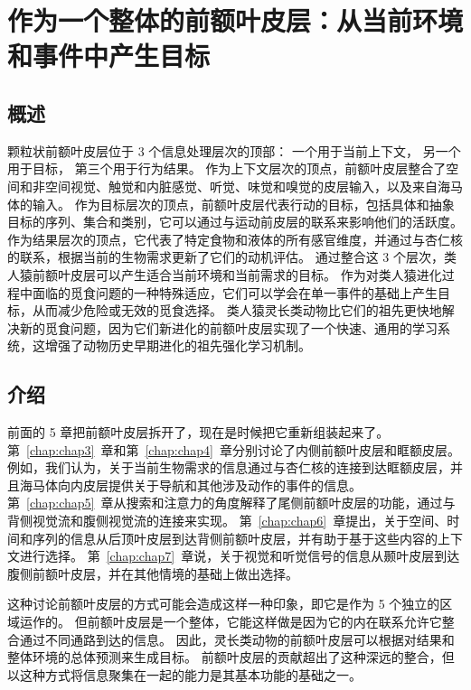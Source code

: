 \chapter{作为一个整体的前额叶皮层：从当前环境和事件中产生目标} \label{chap:chap8}

\section{概述}

颗粒状前额叶皮层位于 3 个信息处理层次的顶部：
一个用于当前上下文，
另一个用于目标，
第三个用于行为结果。
作为上下文层次的顶点，前额叶皮层整合了空间和非空间视觉、触觉和内脏感觉、听觉、味觉和嗅觉的皮层输入，以及来自海马体的输入。
作为目标层次的顶点，前额叶皮层代表行动的目标，包括具体和抽象目标的序列、集合和类别，它可以通过与运动前皮层的联系来影响他们的活跃度。
作为结果层次的顶点，它代表了特定食物和液体的所有感官维度，并通过与杏仁核的联系，根据当前的生物需求更新了它们的动机评估。
通过整合这 3 个层次，类人猿前额叶皮层可以产生适合当前环境和当前需求的目标。
作为对类人猿进化过程中面临的觅食问题的一种特殊适应，它们可以学会在单一事件的基础上产生目标，从而减少危险或无效的觅食选择。
类人猿灵长类动物比它们的祖先更快地解决新的觅食问题，因为它们新进化的前额叶皮层实现了一个快速、通用的学习系统，这增强了动物历史早期进化的祖先强化学习机制。



\section{介绍}
\par

前面的 5 章把前额叶皮层拆开了，现在是时候把它重新组装起来了。
第~\ref{chap:chap3}~章和第~\ref{chap:chap4}~章分别讨论了内侧前额叶皮层和眶额皮层。
例如，我们认为，关于当前生物需求的信息通过与杏仁核的连接到达眶额皮层，并且海马体向内皮层提供关于导航和其他涉及动作的事件的信息。
第~\ref{chap:chap5}~章从搜索和注意力的角度解释了尾侧前额叶皮层的功能，通过与背侧视觉流和腹侧视觉流的连接来实现。
第~\ref{chap:chap6}~章提出，关于空间、时间和序列的信息从后顶叶皮层到达背侧前额叶皮层，并有助于基于这些内容的上下文进行选择。
第~\ref{chap:chap7}~章说，关于视觉和听觉信号的信息从颞叶皮层到达腹侧前额叶皮层，并在其他情境的基础上做出选择。
\par


这种讨论前额叶皮层的方式可能会造成这样一种印象，即它是作为 5 个独立的区域运作的。
但前额叶皮层是一个整体，它能这样做是因为它的内在联系允许它整合通过不同通路到达的信息。
因此，灵长类动物的前额叶皮层可以根据对结果和整体环境的总体预测来生成目标。
前额叶皮层的贡献超出了这种深远的整合，但以这种方式将信息聚集在一起的能力是其基本功能的基础之一。
\par


